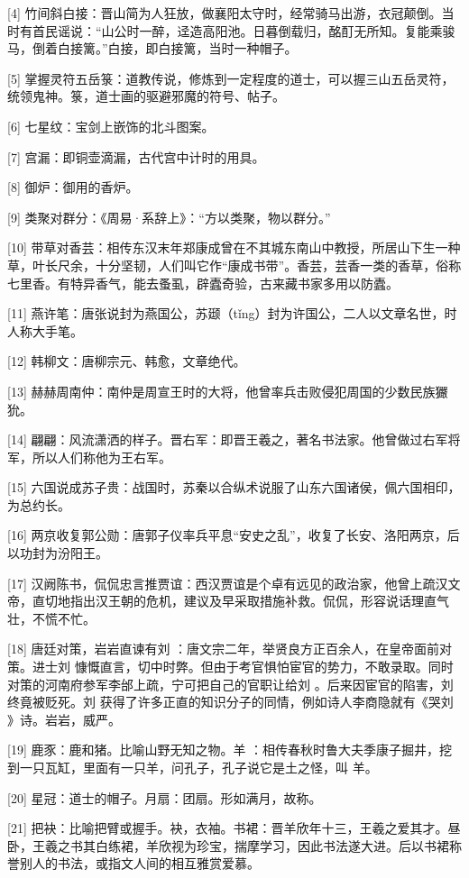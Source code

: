 \documentclass[12pt,UTF8]{ctexbook}
\begin{document}
[4] 竹间斜白接：晋山简为人狂放，做襄阳太守时，经常骑马出游，衣冠颠倒。当时有首民谣说：“山公时一醉，迳造高阳池。日暮倒载归，酩酊无所知。复能乘骏马，倒着白接篱。”白接，即白接篱，当时一种帽子。

[5] 掌握灵符五岳箓：道教传说，修炼到一定程度的道士，可以握三山五岳灵符，统领鬼神。箓，道士画的驱避邪魔的符号、帖子。

[6] 七星纹：宝剑上嵌饰的北斗图案。

[7] 宫漏：即铜壶滴漏，古代宫中计时的用具。

[8] 御炉：御用的香炉。

[9] 类聚对群分：《周易·系辞上》：“方以类聚，物以群分。”

[10] 带草对香芸：相传东汉末年郑康成曾在不其城东南山中教授，所居山下生一种草，叶长尺余，十分坚韧，人们叫它作“康成书带”。香芸，芸香一类的香草，俗称七里香。有特异香气，能去蚤虱，辟蠹奇验，古来藏书家多用以防蠹。

[11] 燕许笔：唐张说封为燕国公，苏颋（tǐng）封为许国公，二人以文章名世，时人称大手笔。

[12] 韩柳文：唐柳宗元、韩愈，文章绝代。

[13] 赫赫周南仲：南仲是周宣王时的大将，他曾率兵击败侵犯周国的少数民族玁狁。

[14] 翩翩：风流潇洒的样子。晋右军：即晋王羲之，著名书法家。他曾做过右军将军，所以人们称他为王右军。

[15] 六国说成苏子贵：战国时，苏秦以合纵术说服了山东六国诸侯，佩六国相印，为总约长。

[16] 两京收复郭公勋：唐郭子仪率兵平息“安史之乱”，收复了长安、洛阳两京，后以功封为汾阳王。

[17] 汉阙陈书，侃侃忠言推贾谊：西汉贾谊是个卓有远见的政治家，他曾上疏汉文帝，直切地指出汉王朝的危机，建议及早采取措施补救。侃侃，形容说话理直气壮，不慌不忙。

[18] 唐廷对策，岩岩直谏有刘 ：唐文宗二年，举贤良方正百余人，在皇帝面前对策。进士刘 慷慨直言，切中时弊。但由于考官惧怕宦官的势力，不敢录取。同时对策的河南府参军李邰上疏，宁可把自己的官职让给刘 。后来因宦官的陷害，刘 终竟被贬死。刘 获得了许多正直的知识分子的同情，例如诗人李商隐就有《哭刘 》诗。岩岩，威严。

[19] 鹿豕：鹿和猪。比喻山野无知之物。羊 ：相传春秋时鲁大夫季康子掘井，挖到一只瓦缸，里面有一只羊，问孔子，孔子说它是土之怪，叫 羊。

[20] 星冠：道士的帽子。月扇：团扇。形如满月，故称。

[21] 把袂：比喻把臂或握手。袂，衣袖。书裙：晋羊欣年十三，王羲之爱其才。昼卧，王羲之书其白练裙，羊欣视为珍宝，揣摩学习，因此书法遂大进。后以书裙称誉别人的书法，或指文人间的相互雅赏爱慕。
\end{document}
